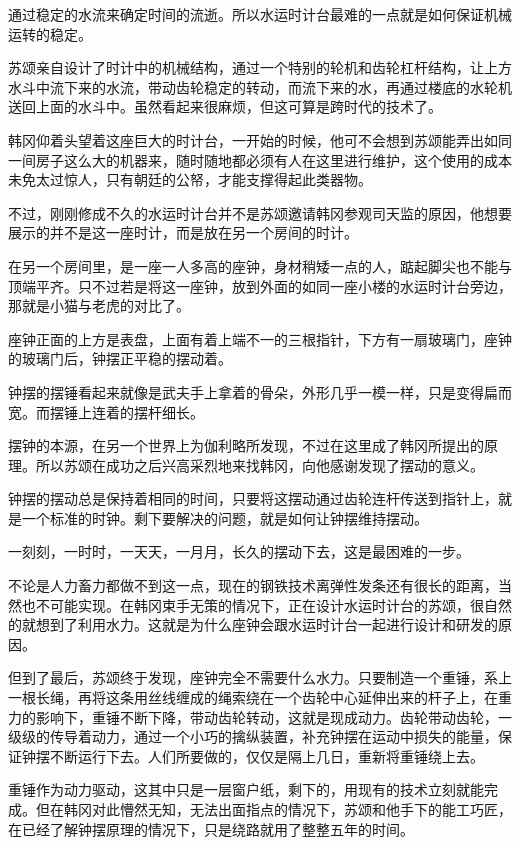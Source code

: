 通过稳定的水流来确定时间的流逝。所以水运时计台最难的一点就是如何保证机械运转的稳定。

苏颂亲自设计了时计中的机械结构，通过一个特别的轮机和齿轮杠杆结构，让上方水斗中流下来的水流，带动齿轮稳定的转动，而流下来的水，再通过楼底的水轮机送回上面的水斗中。虽然看起来很麻烦，但这可算是跨时代的技术了。

韩冈仰着头望着这座巨大的时计台，一开始的时候，他可不会想到苏颂能弄出如同一间房子这么大的机器来，随时随地都必须有人在这里进行维护，这个使用的成本未免太过惊人，只有朝廷的公帑，才能支撑得起此类器物。

不过，刚刚修成不久的水运时计台并不是苏颂邀请韩冈参观司天监的原因，他想要展示的并不是这一座时计，而是放在另一个房间的时计。

在另一个房间里，是一座一人多高的座钟，身材稍矮一点的人，踮起脚尖也不能与顶端平齐。只不过若是将这一座钟，放到外面的如同一座小楼的水运时计台旁边，那就是小猫与老虎的对比了。

座钟正面的上方是表盘，上面有着上端不一的三根指针，下方有一扇玻璃门，座钟的玻璃门后，钟摆正平稳的摆动着。

钟摆的摆锤看起来就像是武夫手上拿着的骨朵，外形几乎一模一样，只是变得扁而宽。而摆锤上连着的摆杆细长。

摆钟的本源，在另一个世界上为伽利略所发现，不过在这里成了韩冈所提出的原理。所以苏颂在成功之后兴高采烈地来找韩冈，向他感谢发现了摆动的意义。

钟摆的摆动总是保持着相同的时间，只要将这摆动通过齿轮连杆传送到指针上，就是一个标准的时钟。剩下要解决的问题，就是如何让钟摆维持摆动。

一刻刻，一时时，一天天，一月月，长久的摆动下去，这是最困难的一步。

不论是人力畜力都做不到这一点，现在的钢铁技术离弹性发条还有很长的距离，当然也不可能实现。在韩冈束手无策的情况下，正在设计水运时计台的苏颂，很自然的就想到了利用水力。这就是为什么座钟会跟水运时计台一起进行设计和研发的原因。

但到了最后，苏颂终于发现，座钟完全不需要什么水力。只要制造一个重锤，系上一根长绳，再将这条用丝线缠成的绳索绕在一个齿轮中心延伸出来的杆子上，在重力的影响下，重锤不断下降，带动齿轮转动，这就是现成动力。齿轮带动齿轮，一级级的传导着动力，通过一个小巧的擒纵装置，补充钟摆在运动中损失的能量，保证钟摆不断运行下去。人们所要做的，仅仅是隔上几日，重新将重锤绕上去。

重锤作为动力驱动，这其中只是一层窗户纸，剩下的，用现有的技术立刻就能完成。但在韩冈对此懵然无知，无法出面指点的情况下，苏颂和他手下的能工巧匠，在已经了解钟摆原理的情况下，只是绕路就用了整整五年的时间。

